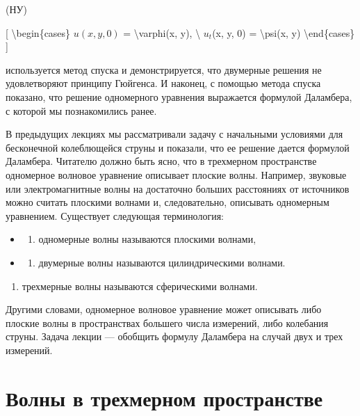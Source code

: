 \documentclass[
]{article}
\providecommand{\tightlist}{%
  \setlength{\itemsep}{0pt}\setlength{\parskip}{0pt}}
\begin{document}
{{(НУ)

{[} \textbackslash begin\{cases\} \(u(x, y, 0)\) =
\textbackslash varphi(x, y), \textbackslash{} \(u_t\)(x, y, 0) =
\textbackslash psi(x, y) \textbackslash end\{cases\} {]}

используется метод спуска и демонстрируется, что двумерные решения не
удовлетворяют принципу Гюйгенса. И наконец, с помощью метода спуска
показано, что решение одномерного уравнения выражается формулой
Даламбера, с которой мы познакомились ранее.

В предыдущих лекциях мы рассматривали задачу с начальными условиями для
бесконечной колеблющейся струны и показали, что ее решение дается
формулой Даламбера. Читателю должно быть ясно, что в трехмерном
пространстве одномерное волновое уравнение описывает плоские волны.
Например, звуковые или электромагнитные волны на достаточно больших
расстояниях от источников можно считать плоскими волнами и,
следовательно, описывать одномерным уравнением. Существует следующая
терминология:

\begin{itemize}
\tightlist
\item
  \begin{enumerate}
  \def\labelenumi{\arabic{enumi})}
  \tightlist
  \item
    одномерные волны называются плоскими волнами,
  \end{enumerate}
\item
  \begin{enumerate}
  \def\labelenumi{\arabic{enumi})}
  \setcounter{enumi}{1}
  \tightlist
  \item
    двумерные волны называются цилиндрическими волнами.
  \end{enumerate}
\end{itemize}

\begin{enumerate}
\def\labelenumi{\arabic{enumi})}
\setcounter{enumi}{2}
\tightlist
\item
  трехмерные волны называются сферическими волнами.
\end{enumerate}

Другими словами, одномерное волновое уравнение может описывать либо
плоские волны в пространствах большего числа измерений, либо колебания
струны. Задача лекции --- обобщить формулу Даламбера на случай двух и
трех измерений.

\section{Волны в трехмерном
пространстве}\label{ux432ux43eux43bux43dux44b-ux432-ux442ux440ux435ux445ux43cux435ux440ux43dux43eux43c-ux43fux440ux43eux441ux442ux440ux430ux43dux441ux442ux432ux435}

}}
\end{document}
